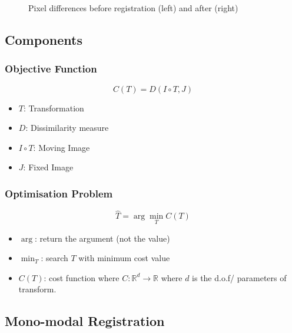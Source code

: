 \documentclass[11pt]{article}
\begin{document}
\begin{figure}[H]
    \centering
    \caption*{Pixel differences before registration (left) and after (right)}
\end{figure}

\subsection{Components}

\subsubsection{Objective Function}

\begin{equation}
    C(T) = D(I \circ T, J)
\end{equation}

\begin{itemize}
    \item $T$: Transformation
    \item $D$: Dissimilarity measure
    \item $I\circ T$: Moving Image
    \item $J$: Fixed Image
\end{itemize}

\subsubsection{Optimisation Problem}

\begin{equation}
    \hat T = \arg \min_T C(T)
\end{equation}

\begin{itemize}
    \item $\arg$: return the argument (not the value)
    \item $\min_T$: search $T$ with minimum cost value
    \item $C(T)$: cost function where $C:\mathbb R^d \rightarrow \mathbb R$ where $d$ is the d.o.f/ parameters of transform.
\end{itemize}

\subsection{Mono-modal Registration}
\end{document}

